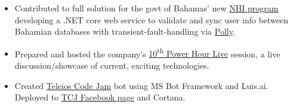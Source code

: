\documentclass{resume}
\newcommand{\ts}{\textsuperscript}
\begin{document}
\begin{minipage}[t]{0.66\linewidth}
\begin{itemize}
    \item Contributed to full solution for the govt of Bahamas' new \href{http://www.nhibahamas.gov.bs/}{NHI program} developing a .NET core web service to validate and sync user info between Bahamian databases with transient-fault-handling via \href{https://github.com/App-vNext/Polly}{Polly}.
    \item Prepared and hosted the company's \href{https://www.teleioscodejam.com/news/2017/8/11/powar-hour-live}{10\ts{th} Power Hour Live} session, a live discussion/showcase of current, exciting technologies.
    \item Created \href{https://www.teleioscodejam.com/}{Teleios Code Jam} bot using MS Bot Framework and Luis.ai. Deployed to \href{https://www.facebook.com/TeleiosCodeJam/}{TCJ Facebook page} and Cortana.
\end{itemize}


\end{minipage}
\end{document}
